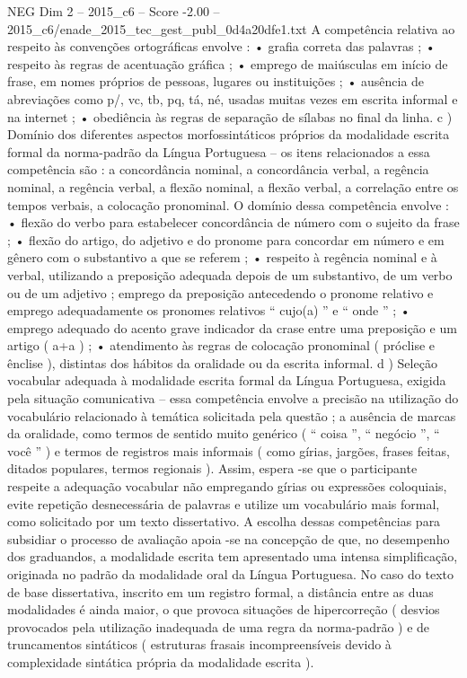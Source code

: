 \begin{textsample}{NEG Dim 2 – 2015\_c6 – Score -2.00 – 2015\_c6/enade\_2015\_tec\_gest\_publ\_0d4a20dfe1.txt}
A competência relativa ao respeito às convenções ortográficas envolve : • grafia correta das palavras ; • respeito às regras de acentuação gráfica ; • emprego de maiúsculas em início de frase, em nomes próprios de pessoas, lugares ou instituições ; • ausência de abreviações como p/, vc, tb, pq, tá, né, usadas muitas vezes em escrita informal e na internet ; • obediência às regras de separação de sílabas no final da linha. c ) Domínio dos diferentes aspectos morfossintáticos próprios da modalidade escrita formal da norma-padrão da Língua Portuguesa – os itens relacionados a essa competência são : a concordância nominal, a concordância verbal, a regência nominal, a regência verbal, a flexão nominal, a flexão verbal, a correlação entre os tempos verbais, a colocação pronominal.
O domínio dessa competência envolve : • flexão do verbo para estabelecer concordância de número com o sujeito da frase ; • flexão do artigo, do adjetivo e do pronome para concordar em número e em gênero com o substantivo a que se referem ; • respeito à regência nominal e à verbal, utilizando a preposição adequada depois de um substantivo, de um verbo ou de um adjetivo ; emprego da preposição antecedendo o pronome relativo e emprego adequadamente os pronomes relativos “ cujo(a) ” e “ onde ” ; • emprego adequado do acento grave indicador da crase entre uma preposição e um artigo ( a+a ) ; • atendimento às regras de colocação pronominal ( próclise e ênclise ), distintas dos hábitos da oralidade ou da escrita informal. d ) Seleção vocabular adequada à modalidade escrita formal da Língua Portuguesa, exigida pela situação comunicativa – essa competência envolve a precisão na utilização do vocabulário relacionado à temática solicitada pela questão ; a ausência de marcas da oralidade, como termos de sentido muito genérico ( “ coisa ”, “ negócio ”, “ você ” ) e termos de registros mais informais ( como gírias, jargões, frases feitas, ditados populares, termos regionais ).
Assim, espera -se que o participante respeite a adequação vocabular não empregando gírias ou expressões coloquiais, evite repetição desnecessária de palavras e utilize um vocabulário mais formal, como solicitado por um texto dissertativo.
A escolha dessas competências para subsidiar o processo de avaliação apoia -se na concepção de que, no desempenho dos graduandos, a modalidade escrita tem apresentado uma intensa simplificação, originada no padrão da modalidade oral da Língua Portuguesa.
No caso do texto de base dissertativa, inscrito em um registro formal, a distância entre as duas modalidades é ainda maior, o que provoca situações de hipercorreção ( desvios provocados pela utilização inadequada de uma regra da norma-padrão ) e de truncamentos sintáticos ( estruturas frasais incompreensíveis devido à complexidade sintática própria da modalidade escrita ).

\end{textsample}
